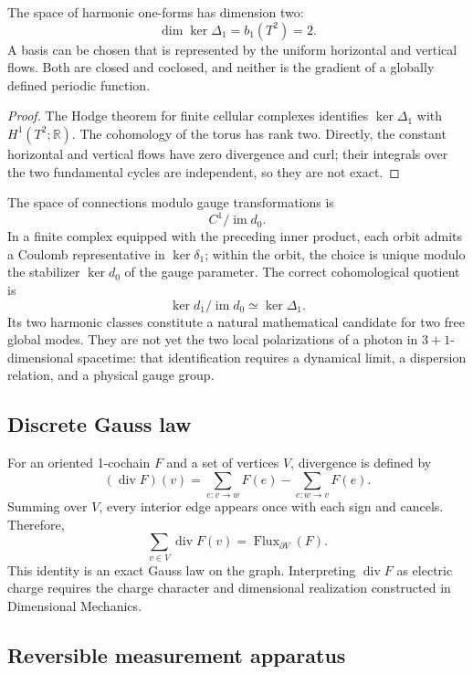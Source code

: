 \begin{theorem}
\label{v:v:rec:completaciones:statement:04}
The space of harmonic one-forms has dimension two:
\[
 \dim\ker\Delta_1=b_1(T^2)=2.
\]
A basis can be chosen that is represented by the uniform horizontal and
vertical flows. Both are closed and coclosed, and neither is the gradient of
a globally defined periodic function.
\end{theorem}

\begin{proof}
The Hodge theorem for finite cellular complexes identifies
\(\ker\Delta_1\) with \(H^1(T^2;\mathbb R)\). The cohomology of the torus has
rank two. Directly, the constant horizontal and vertical flows have
zero divergence and curl; their integrals over the two fundamental
cycles are independent, so they are not exact.
\end{proof}

The space of connections modulo gauge transformations is
\[
 C^1/\operatorname{im}d_0.
\]
In a finite complex equipped with the preceding inner product, each orbit
admits a Coulomb representative in \(\ker\delta_1\); within the orbit,
the choice is unique modulo the stabilizer \(\ker d_0\) of the gauge
parameter. The correct cohomological quotient is
\[
 \ker d_1/\operatorname{im}d_0
 \simeq \ker\Delta_1 .
\]
Its two harmonic classes constitute a natural mathematical candidate for
two free global modes. They are not yet the two local polarizations of
a photon in \(3+1\)-dimensional spacetime: that identification requires a
dynamical limit, a dispersion relation, and a physical gauge group.

\subsection{Discrete Gauss law}
\label{v:v:rec:completaciones:section:09}

For an oriented 1-cochain \(F\) and a set of vertices \(V\),
divergence is defined by
\[
 (\operatorname{div}F)(v)=
 \sum_{e:v\to w}F(e)-\sum_{e:w\to v}F(e).
\]
Summing over \(V\), every interior edge appears once with each sign and
cancels. Therefore,
\[
 \boxed{
 \sum_{v\in V}\operatorname{div}F(v)
 =\operatorname{Flux}_{\partial V}(F).}
\]
This identity is an exact Gauss law on the graph. Interpreting
\(\operatorname{div}F\) as electric charge requires the charge character and
dimensional realization constructed in Dimensional Mechanics.

\subsection{Reversible measurement apparatus}
\label{v:v:rec:completaciones:section:10}

